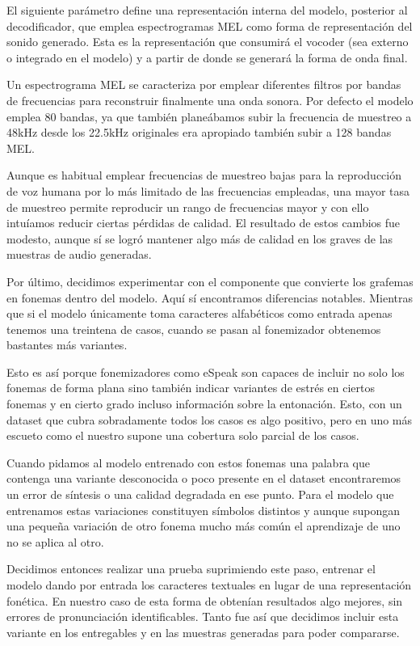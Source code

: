El siguiente parámetro define una representación interna del modelo, posterior al decodificador, que emplea espectrogramas MEL como forma de representación del sonido generado. Esta es la representación que consumirá el vocoder (sea externo o integrado en el modelo) y a partir de donde se generará la forma de onda final.

Un espectrograma MEL se caracteriza por emplear diferentes filtros por bandas de frecuencias para reconstruir finalmente una onda sonora. Por defecto el modelo emplea 80 bandas, ya que también planeábamos subir la frecuencia de muestreo a 48kHz desde los 22.5kHz originales era apropiado también subir a 128 bandas MEL.

Aunque es habitual emplear frecuencias de muestreo bajas para la reproducción de voz humana por lo más limitado de las frecuencias empleadas, una mayor tasa de muestreo permite reproducir un rango de frecuencias mayor y con ello intuíamos reducir ciertas pérdidas de calidad. El resultado de estos cambios fue modesto, aunque sí se logró mantener algo más de calidad en los graves de las muestras de audio generadas.

Por último, decidimos experimentar con el componente que convierte los grafemas en fonemas dentro del modelo. Aquí sí encontramos diferencias notables. Mientras que si el modelo únicamente toma caracteres alfabéticos como entrada apenas tenemos una treintena de casos, cuando se pasan al fonemizador obtenemos bastantes más variantes.

Esto es así porque fonemizadores como eSpeak son capaces de incluir no solo los fonemas de forma plana sino también indicar variantes de estrés en ciertos fonemas y en cierto grado incluso información sobre la entonación. Esto, con un dataset que cubra sobradamente todos los casos es algo positivo, pero en uno más escueto como el nuestro supone una cobertura solo parcial de los casos.

Cuando pidamos al modelo entrenado con estos fonemas una palabra que contenga una variante desconocida o poco presente en el dataset encontraremos un error de síntesis o una calidad degradada en ese punto. Para el modelo que entrenamos estas variaciones constituyen símbolos distintos y aunque supongan una pequeña variación de otro fonema mucho más común el aprendizaje de uno no se aplica al otro.

Decidimos entonces realizar una prueba suprimiendo este paso, entrenar el modelo dando por entrada los caracteres textuales en lugar de una representación fonética. En nuestro caso de esta forma de obtenían resultados algo mejores, sin errores de pronunciación identificables. Tanto fue así que decidimos incluir esta variante en los entregables y en las muestras generadas para poder compararse.

